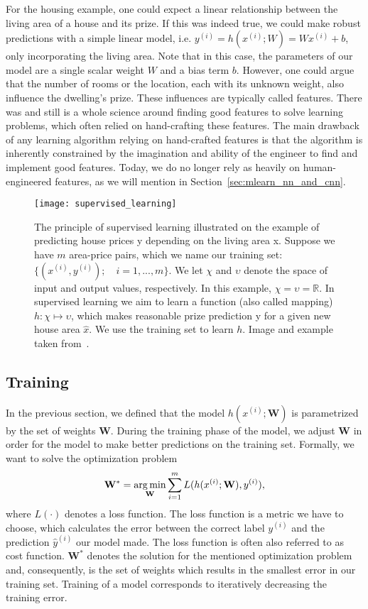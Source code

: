 For the housing example, one could expect a linear relationship between the living area of a house and its prize. If this was indeed true, we could make robust predictions with a simple linear model, i.e. $y^{(i)} = h(x^{(i)}; W) = Wx^{(i)} + b$, only incorporating the living area. Note that in this case, the parameters of our model are a single scalar weight $W$ and a bias term $b$.
However, one could argue that the number of rooms or the location, each with its unknown weight, also influence the dwelling's prize. These influences are typically called features. There was and still is a whole science around finding good features to solve learning problems, which often relied on hand-crafting these features. The main drawback of any learning algorithm relying on hand-crafted features is that the algorithm is inherently constrained by the imagination and ability of the engineer to find and implement good features. Today, we do no longer rely as heavily on human-engineered features, as we will mention in Section~\ref{sec:mlearn_nn_and_cnn}.

\begin{figure}[htbp]
    \centering
	\texttt{[image: supervised\_learning]}
    \caption[Supervised Learning]{The principle of supervised learning illustrated on the example of predicting house prices y depending on the living area x. Suppose we have $m$ area-price pairs, which we name our training set: $\{(x^{(i)}, y^{(i)}); \quad i = 1,...,m\}$. We let $\chi$ and $\upsilon$ denote the space of input and output values, respectively. In this example, $\chi = \upsilon = \mathbb{R}$. In supervised learning we aim to learn a function (also called mapping) $h : \chi \mapsto \upsilon$, which makes reasonable prize prediction y for a given new house area $\hat{x}$. We use the training set to learn $h$. Image and example taken from~\cite{Ng2012StanfordNotes}.}
    \label{fig:dl_supervised}
\end{figure}

\subsection{Training}
In the previous section, we defined that the model $h(x^{(i)}; \mathbf{W})$ is parametrized by the set of weights $\textbf{W}$. During the training phase of the model, we adjust $\textbf{W}$ in order for the model to make better predictions on the training set. Formally, we want to solve the optimization problem
\begin{equation}
   \mathbf{W}^{*} = \operatorname*{arg\,min}_\textbf{W} \sum_{i=1}^{m} L(h(x^{(i)}; \mathbf{W}), y^{(i)}),
   \label{eq:optimization}
\end{equation}
where $L(\cdot)$ denotes a loss function. The loss function is a metric we have to choose, which calculates the error between the correct label $y^{(i)}$ and the prediction $\hat{y}^{(i)}$ our model made. The loss function is often also referred to as cost function. $\mathbf{W}^{*}$ denotes the solution for the mentioned optimization problem and, consequently, is the set of weights which results in the smallest error in our training set. Training of a model corresponds to iteratively decreasing the training error.

